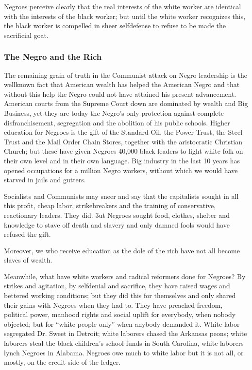 \documentclass[letterpaper,10pt,english]{jupyterBook}
\begin{document}
\sphinxAtStartPar
Negroes perceive clearly that the real interests of the white worker are identical with the interests of the black worker; but until the white worker recognizes this, the black worker is compelled in sheer self\sphinxhyphen{}defense to refuse to be made the sacrificial goat.


\subsubsection{The Negro and the Rich}
\label{\detokenize{Volumes/38/09/negro_and_communism:the-negro-and-the-rich}}
\sphinxAtStartPar
The remaining grain of truth in the Communist attack on Negro leadership is the well\sphinxhyphen{}known fact that American wealth has helped the American Negro and that without this help the Negro could not have attained his present advancement. American courts from the Supreme Court down are dominated by wealth and Big Business, yet they are today the Negro’s only protection against complete disfranchisement, segregation and the abolition of his public schools. Higher education for Negroes is the gift of the Standard Oil, the Power Trust, the Steel Trust and the Mail Order Chain Stores, together with the aristocratic Christian Church; but these have given Negroes 40,000 black leaders to fight white folk on their own level and in their own language. Big industry in the last 10 years has opened occupations for a million Negro workers, without which we would have starved in jails and gutters.

\sphinxAtStartPar
Socialists and Communists may sneer and say that the capitalists sought in all this profit, cheap labor, strike\sphinxhyphen{}breakers and the training of conservative, reactionary leaders. They did. 3ut Negroes sought food, clothes, shelter and knowledge to stave off death and slavery and only damned fools would have refused the gift.

\sphinxAtStartPar
Moreover, we who receive education as the dole of the rich have not all become slaves of wealth.

\sphinxAtStartPar
Meanwhile, what have white workers and radical reformers done for Negroes? By strikes and agitation, by self\sphinxhyphen{}denial and sacrifice, they have raised wages and bettered working conditions; but they did this for themselves and only shared their gains with Negroes when they had to. They have preached freedom, political power, manhood rights and social uplift for everybody, when nobody objected; but for “white people only” when anybody demanded it. White labor segregated Dr. Sweet in Detroit; white laborers chased the Arkansas peons; white laborers steal the black children’s school funds in South Carolina, white laborers lynch Negroes in Alabama. Negroes owe much to white labor but it is not all, or mostly, on the credit side of the ledger.
\end{document}
